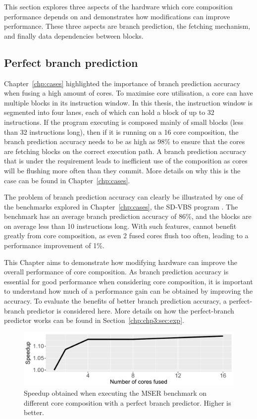 This section explores three aspects of the hardware which core composition performance depends on and demonstrates how modifications can improve performance.
These three aspects are branch prediction, the fetching mechanism, and finally data dependencies between blocks.

\subsection{Perfect branch prediction}

Chapter~\ref{chp:cases} highlighted the importance of branch prediction accuracy when fusing a high amount of cores.
To maximise core utilisation, a core can have multiple blocks in its instruction window.
In this thesis, the instruction window is segmented into four lanes, each of which can hold a block of up to 32 instructions.
If the program executing is composed mainly of small blocks (less than 32 instructions long), then if it is running on a 16 core composition, the branch prediction accuracy needs to be as high as 98\% to ensure that the cores are fetching blocks on the correct execution path.
A branch prediction accuracy that is under the requirement leads to inefficient use of the composition as cores will be flushing more often than they commit.
More details on why this is the case can be found in Chapter~\ref{chp:cases}.

The problem of branch prediction accuracy can clearly be illustrated by one of the benchmarks explored in Chapter~\ref{chp:cases}, the SD-VBS program .
The benchmark has an average branch prediction accuracy of 86\%, and the blocks are on average less than 10 instructions long.
With such features,  cannot benefit greatly from core composition, as even 2 fused cores flush too often, leading to a performance improvement of 1\%.

This Chapter aims to demonstrate how modifying hardware can improve the overall performance of core composition.
As branch prediction accuracy is essential for good performance when considering core composition, it is important to understand how much of a performance gain can be obtained by improving the accuracy.
To evaluate the benefits of better branch prediction accuracy, a perfect-branch predictor is considered here.
More details on how the perfect-branch predictor works can be found in Section~\ref{chp:chp3:sec:exp}.

\begin{figure}[t]
    \centering
    \includegraphics[width=1\textwidth]{chapter3/graphics/motiv_branch_mser.pdf}
    \caption{Speedup obtained when executing the MSER benchmark on different core composition with a perfect branch predictor. Higher is better.}
    \label{fig:mser_motiv}
	\vspace{1em}
\end{figure}

